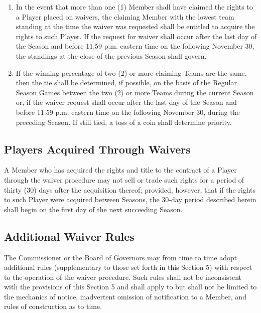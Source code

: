 \documentclass[]{book}
\providecommand{\tightlist}{%
  \setlength{\itemsep}{0pt}\setlength{\parskip}{0pt}}
\theoremstyle{definition}
\theoremstyle{definition}
\theoremstyle{definition}
\theoremstyle{remark}
\begin{document}
\begin{enumerate}
\def\labelenumi{(\alph{enumi})}
\tightlist
\item
  In the event that more than one (1) Member shall have claimed the
  rights to a Player placed on waivers, the claiming Member with the
  lowest team standing at the time the waiver was requested shall be
  entitled to acquire the rights to such Player. If the request for
  waiver shall occur after the last day of the Season and before 11:59
  p.m. eastern time on the following November 30, the standings at the
  close of the previous Season shall govern.
\item
  If the winning percentage of two (2) or more claiming Teams are the
  same, then the tie shall be determined, if possible, on the basis of
  the Regular Season Games between the two (2) or more Teams during the
  current Season or, if the waiver request shall occur after the last
  day of the Season and before 11:59 p.m. eastern time on the following
  November 30, during the preceding Season. If still tied, a toss of a
  coin shall determine priority.
\end{enumerate}

\subsection{Players Acquired Through
Waivers}\label{players-acquired-through-waivers}

A Member who has acquired the rights and title to the contract of a
Player through the waiver procedure may not sell or trade such rights
for a period of thirty (30) days after the acquisition thereof;
provided, however, that if the rights to such Player were acquired
between Seasons, the 30-day period described herein shall begin on the
first day of the next succeeding Season.

\subsection{Additional Waiver Rules}\label{additional-waiver-rules}

The Commissioner or the Board of Governors may from time to time adopt
additional rules (supplementary to those set forth in this Section 5)
with respect to the operation of the waiver procedure. Such rules shall
not be inconsistent with the provisions of this Section 5 and shall
apply to but shall not be limited to the mechanics of notice,
inadvertent omission of notification to a Member, and rules of
construction as to time.
\end{document}
